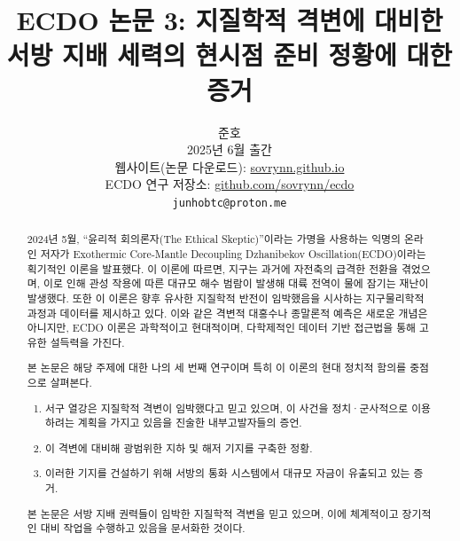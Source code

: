 \documentclass[10pt,twocolumn,letterpaper]{article}
\begin{document}
\title{ECDO 논문 3: 지질학적 격변에 대비한 서방 지배 세력의 현시점 준비 정황에 대한 증거}

\author{준호\\
2025년 6월 출간\\
웹사이트(논문 다운로드): \href{https://sovrynn.github.io}{sovrynn.github.io}\\
ECDO 연구 저장소: \href{https://github.com/sovrynn/ecdo}{github.com/sovrynn/ecdo}\\
{\tt\small junhobtc@proton.me}
}

\maketitle

\begin{abstract}
2024년 5월, “윤리적 회의론자(The Ethical Skeptic)”이라는 가명을 사용하는 익명의 온라인 저자가 Exothermic Core-Mantle Decoupling Dzhanibekov Oscillation(ECDO)이라는 획기적인 이론을 발표했다\cite{0,1}. 이 이론에 따르면, 지구는 과거에 자전축의 급격한 전환을 겪었으며, 이로 인해 관성 작용에 따른 대규모 해수 범람이 발생해 대륙 전역이 물에 잠기는 재난이 발생했다. 또한 이 이론은 향후 유사한 지질학적 반전이 임박했음을 시사하는 지구물리학적 과정과 데이터를 제시하고 있다. 이와 같은 격변적 대홍수나 종말론적 예측은 새로운 개념은 아니지만, ECDO 이론은 과학적이고 현대적이며, 다학제적인 데이터 기반 접근법을 통해 고유한 설득력을 가진다.

본 논문은 해당 주제에 대한 나의 세 번째 연구\cite{2,3}이며 특히 이 이론의 현대 정치적 함의를 중점으로 살펴본다.

\begin{flushleft}
\begin{enumerate}
    \item 서구 열강은 지질학적 격변이 임박했다고 믿고 있으며, 이 사건을 정치·군사적으로 이용하려는 계획을 가지고 있음을 진술한 내부고발자들의 증언.
    \item 이 격변에 대비해 광범위한 지하 및 해저 기지를 구축한 정황.
    \item 이러한 기지를 건설하기 위해 서방의 통화 시스템에서 대규모 자금이 유출되고 있는 증거.
\end{enumerate}
\end{flushleft}

본 논문은 서방 지배 권력들이 임박한 지질학적 격변을 믿고 있으며, 이에 체계적이고 장기적인 대비 작업을 수행하고 있음을 문서화한 것이다.
\end{abstract}
\end{document}
